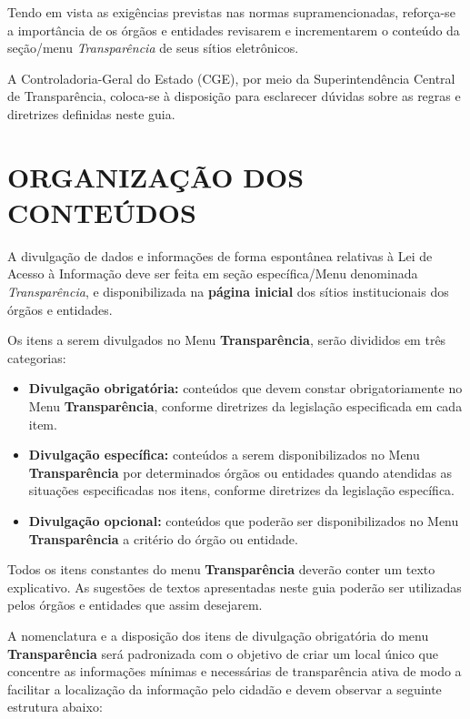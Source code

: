 \documentclass[
]{book}
\begin{document}
Tendo em vista as exigências previstas nas normas supramencionadas, reforça-se a importância de os órgãos e entidades revisarem e incrementarem o conteúdo da seção/menu \emph{Transparência} de seus sítios eletrônicos.

A Controladoria-Geral do Estado (CGE), por meio da Superintendência Central de Transparência, coloca-se à disposição para esclarecer dúvidas sobre as regras e diretrizes definidas neste guia.

\hypertarget{organizauxe7uxe3o-dos-conteuxfados}{%
\chapter{ORGANIZAÇÃO DOS CONTEÚDOS}\label{organizauxe7uxe3o-dos-conteuxfados}}

A divulgação de dados e informações de forma espontânea relativas à Lei de Acesso à Informação deve ser feita em seção específica/Menu denominada \emph{Transparência}, e disponibilizada na \textbf{página inicial} dos sítios institucionais dos órgãos e entidades.

Os itens a serem divulgados no Menu \textbf{Transparência}, serão divididos em três categorias:

\begin{itemize}
\item
  \textbf{Divulgação obrigatória:} conteúdos que devem constar obrigatoriamente no Menu \textbf{Transparência}, conforme diretrizes da legislação especificada em cada item.
\item
  \textbf{Divulgação específica:} conteúdos a serem disponibilizados no Menu \textbf{Transparência} por determinados órgãos ou entidades quando atendidas as situações especificadas nos itens, conforme diretrizes da legislação específica.
\item
  \textbf{Divulgação opcional:} conteúdos que poderão ser disponibilizados no Menu \textbf{Transparência} a critério do órgão ou entidade.
\end{itemize}

Todos os itens constantes do menu \textbf{Transparência} deverão conter um texto explicativo. As sugestões de textos apresentadas neste guia poderão ser utilizadas pelos órgãos e entidades que assim desejarem.

A nomenclatura e a disposição dos itens de divulgação obrigatória do menu \textbf{Transparência} será padronizada com o objetivo de criar um local único que concentre as informações mínimas e necessárias de transparência ativa de modo a facilitar a localização da informação pelo cidadão e devem observar a seguinte estrutura abaixo:
\end{document}
